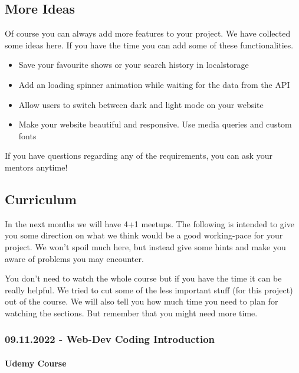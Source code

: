 \documentclass[
]{article}
\providecommand{\tightlist}{%
  \setlength{\itemsep}{0pt}\setlength{\parskip}{0pt}}
\begin{document}
\hypertarget{more-ideas}{%
\subsection{More Ideas}\label{more-ideas}}

Of course you can always add more features to your project. We have collected some ideas here. If you have the time you can add some of these functionalities.

\begin{itemize}
\tightlist
\item
  Save your favourite shows or your search history in localstorage
\item
  Add an loading spinner animation while waiting for the data from the API
\item
  Allow users to switch between dark and light mode on your website
\item
  Make your website beautiful and responsive. Use media queries and custom fonts
\end{itemize}

If you have questions regarding any of the requirements, you can ask your mentors anytime!

\hypertarget{curriculum}{%
\subsection{Curriculum}\label{curriculum}}

In the next months we will have 4+1 meetups. The following is intended to give you some direction on what we think would be a good working-pace for your project. We won't spoil much here, but instead give some hints and make you aware of problems you may encounter.

You don't need to watch the whole course but if you have the time it can be really helpful. We tried to cut some of the less important stuff (for this project) out of the course. We will also tell you how much time you need to plan for watching the sections. But remember that you might need more time.

\hypertarget{web-dev-coding-introduction}{%
\subsubsection*{09.11.2022 - Web-Dev Coding Introduction}\label{web-dev-coding-introduction}}

\hypertarget{udemy-course}{%
\paragraph*{Udemy Course}\label{udemy-course}}
\end{document}
